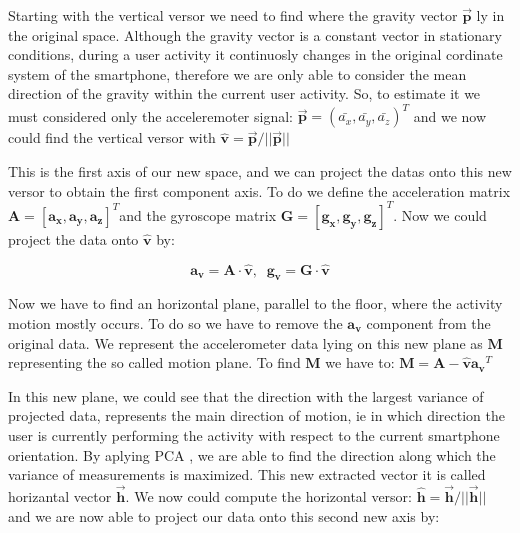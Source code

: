 Starting with the vertical versor we need to find where the gravity vector $\boldsymbol{\vec{p}}$ ly in the original space. Although the gravity vector is a constant vector in stationary conditions, during a user activity it continuosly changes in the original cordinate system of the smartphone, therefore we are only able to consider the mean direction of the gravity within the current user activity. So, to estimate it we must considered only the acceleremoter signal: \mbox{$ \boldsymbol{\vec{p}} = (\bar{a_{x}}, \bar{a_{y}}, \bar{a_{z}})^{T}$}  and we now could find the vertical versor with \mbox{$ \boldsymbol{\hat{v}} = \boldsymbol{\vec{p}} / ||\boldsymbol{\vec{p}}|| $}

This is the first axis of our new space, and we can project the datas onto this new versor to obtain the first component axis. To do we define the acceleration matrix \mbox{$\boldsymbol{A} = [ \boldsymbol{a_{x}}, \boldsymbol{a_{y}}, \boldsymbol{a_{z}} ]^{T}$}and the gyroscope matrix \mbox{$\boldsymbol{G} = [ \boldsymbol{g_{x}}, \boldsymbol{g_{y}}, \boldsymbol{g_{z}} ]^{T} $}. Now we could project the data onto $\boldsymbol{\hat{v}}$ by:

\begin{equation}
	\label{v-axis eq}
	 \boldsymbol{a_{v}} = \boldsymbol{A} \cdot \boldsymbol{\hat{v}} ,\;\; \boldsymbol{g_{v}} = \boldsymbol{G} \cdot \boldsymbol{\hat{v}}
\end{equation}

Now we have to find an horizontal plane, parallel to the floor, where the activity motion mostly occurs. To do so we have to remove the  $\boldsymbol{a_{v}}$ component from the original data. We represent the accelerometer data lying on this new plane as $\boldsymbol{M}$ representing the so called motion plane. To find $\boldsymbol{M}$ we have to: \mbox{$\boldsymbol{M} = \boldsymbol{A} - \boldsymbol{\hat{v}} \boldsymbol{a_{v}}^{T} $}

In this new plane, we could see that the direction with the largest variance of projected data, represents the main direction of motion, ie in which direction the user is currently performing the activity with respect to the current smartphone orientation. By aplying PCA \cite{rao1964use}, we are able to find the direction along which the variance of measurements is maximized. This new extracted vector it is called horizantal vector $\boldsymbol{\vec{h}}$. We now could compute the horizontal versor: \mbox{$ \boldsymbol{\hat{h}} = \boldsymbol{\vec{h}} / ||\boldsymbol{\vec{h}}|| $} and we are now able to project our data onto this second new axis by:

